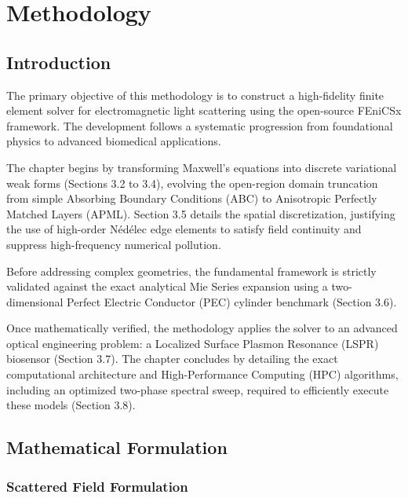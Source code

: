 \chapter{Methodology}

\section{Introduction}

The primary objective of this methodology is to construct a high-fidelity finite element solver for electromagnetic light scattering using the open-source FEniCSx framework. The development follows a systematic progression from foundational physics to advanced biomedical applications.

\vspace{12pt}

The chapter begins by transforming Maxwell's equations into discrete variational weak forms (Sections 3.2 to 3.4), evolving the open-region domain truncation from simple Absorbing Boundary Conditions (ABC) to Anisotropic Perfectly Matched Layers (APML). Section 3.5 details the spatial discretization, justifying the use of high-order Nédélec edge elements to satisfy field continuity and suppress high-frequency numerical pollution.

\vspace{12pt}

Before addressing complex geometries, the fundamental framework is strictly validated against the exact analytical Mie Series expansion using a two-dimensional Perfect Electric Conductor (PEC) cylinder benchmark (Section 3.6).

\vspace{12pt}

Once mathematically verified, the methodology applies the solver to an advanced optical engineering problem: a Localized Surface Plasmon Resonance (LSPR) biosensor (Section 3.7). The chapter concludes by detailing the exact computational architecture and High-Performance Computing (HPC) algorithms, including an optimized two-phase spectral sweep, required to efficiently execute these models (Section 3.8).

\section{Mathematical Formulation}

\subsection{Scattered Field Formulation}

